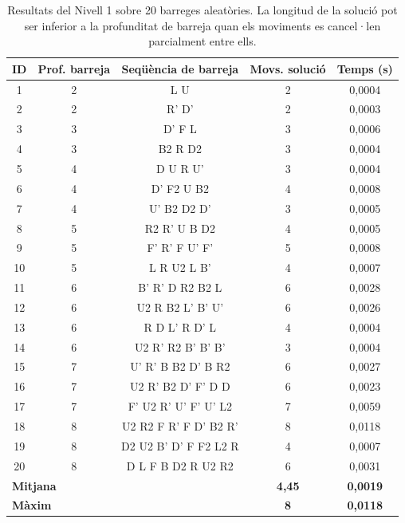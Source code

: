 \documentclass[12pt, a4paper]{article}
\begin{document}
\begin{table}[H]
  \centering
  \small
  \begin{tabular}{ccccc}
    \toprule
    \textbf{ID} & \textbf{Prof. barreja} & \textbf{Seqüència de barreja} & \textbf{Movs. solució} & \textbf{Temps (s)} \\
    \midrule
    1  & 2 & L U                       & 2 & 0{,}0004 \\
    2  & 2 & R' D'                     & 2 & 0{,}0003 \\
    3  & 3 & D' F L                    & 3 & 0{,}0006 \\
    4  & 3 & B2 R D2                   & 3 & 0{,}0004 \\
    5  & 4 & D U R U'                  & 3 & 0{,}0004 \\
    6  & 4 & D' F2 U B2                & 4 & 0{,}0008 \\
    7  & 4 & U' B2 D2 D'               & 3 & 0{,}0005 \\
    8  & 5 & R2 R' U B D2              & 4 & 0{,}0005 \\
    9  & 5 & F' R' F U' F'             & 5 & 0{,}0008 \\
    10 & 5 & L R U2 L B'               & 4 & 0{,}0007 \\
    11 & 6 & B' R' D R2 B2 L          & 6 & 0{,}0028 \\
    12 & 6 & U2 R B2 L' B' U'         & 6 & 0{,}0026 \\
    13 & 6 & R D L' R D' L            & 4 & 0{,}0004 \\
    14 & 6 & U2 R' R2 B' B' B'        & 3 & 0{,}0004 \\
    15 & 7 & U' R' B B2 D' B R2       & 6 & 0{,}0027 \\
    16 & 7 & U2 R' B2 D' F' D D       & 6 & 0{,}0023 \\
    17 & 7 & F' U2 R' U' F' U' L2    & 7 & 0{,}0059 \\
    18 & 8 & U2 R2 F R' F D' B2 R'   & 8 & 0{,}0118 \\
    19 & 8 & D2 U2 B' D' F F2 L2 R   & 4 & 0{,}0007 \\
    20 & 8 & D L F B D2 R U2 R2      & 6 & 0{,}0031 \\
    \midrule
    \multicolumn{3}{l}{\textbf{Mitjana}} & \textbf{4{,}45} & \textbf{0{,}0019} \\
    \multicolumn{3}{l}{\textbf{Màxim}}  & \textbf{8}      & \textbf{0{,}0118} \\
    \bottomrule
  \end{tabular}
  \caption{Resultats del Nivell 1 sobre 20 barreges aleatòries. La longitud de la solució pot ser inferior a la profunditat de barreja quan els moviments es cancel·len parcialment entre ells.}
  \label{tab:bfs_results}
\end{table}
\end{document}
